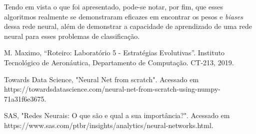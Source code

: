 \documentclass[conference]{IEEEtran}
\begin{document}
Tendo em vista o que foi apresentado, pode-se notar, por fim, que esses algoritmos realmente se demonstraram eficazes em encontrar os pesos e \textit{biases} dessa rede neural, além de demonstrar a capacidade de aprendizado de uma rede neural para esses problemas de classificação.

\begin{thebibliography}{00}
 M. Maximo, ``Roteiro: Laboratório 5 - Estratégias Evolutivas''. Instituto Tecnológico de Aeronáutica, Departamento de Computação. CT-213, 2019.

 Towards Data Science, "Neural Net from scratch". Acessado em https://towardsdatascience.com/neural-net-from-scratch-using-numpy-71a31f6e3675.

 SAS, "Redes Neurais: O que são e qual a sua importância?". Acessado em https://www.sas.com/pt\underline{\space}br/insights/analytics/neural-networks.html.

\end{thebibliography}
\end{document}
